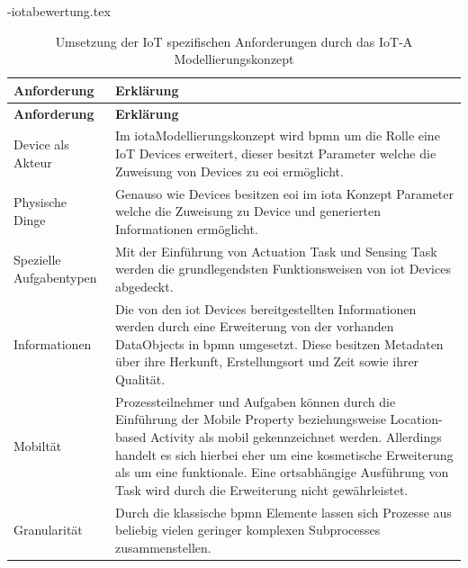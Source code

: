 \documentclass[a4paper, 12pt, twoside, headsepline=true]{scrartcl} %
\begin{document}
\begin{filecontents}{\jobname-iotabewertung.tex}
	\begin{longtable}{P{4cm}|X}
		\caption{Umsetzung der IoT spezifischen Anforderungen durch das IoT-A Modellierungskonzept}\\
		\label{table:evaluierungskriterien}
		\textbf{Anforderung} & \textbf{Erklärung}   \\ \hline
		\endfirsthead %
		\textbf{Anforderung} & \textbf{Erklärung}  \\ \hline
		\endhead
		Device als Akteur & Im \ac{iota}Modellierungskonzept wird \ac{bpmn} um die Rolle eine IoT Devices erweitert, dieser besitzt Parameter welche die Zuweisung von Devices zu \ac{eoi} ermöglicht.\\ \hline
		Physische Dinge  & Genauso wie Devices besitzen \ac{eoi} im \ac{iota} Konzept Parameter welche die Zuweisung zu Device und generierten Informationen ermöglicht.\\ \hline
		Spezielle Aufgabentypen & Mit der Einführung von Actuation Task und Sensing Task werden die grundlegendsten Funktionsweisen von \ac{iot} Devices abgedeckt.\\ \hline
		Informationen  & Die von den \ac{iot} Devices bereitgestellten Informationen werden durch eine Erweiterung von der vorhanden DataObjects in \ac{bpmn} umgesetzt. Diese besitzen Metadaten über ihre Herkunft, Erstellungsort und Zeit sowie ihrer Qualität.\\ \hline
		Mobiltät & Prozessteilnehmer und Aufgaben können durch die Einführung der Mobile Property beziehungsweise Location-based Activity als mobil gekennzeichnet werden. Allerdings handelt es sich hierbei eher um eine kosmetische Erweiterung als um eine funktionale. Eine ortsabhängige Ausführung von Task wird durch die Erweiterung nicht gewährleistet.\\ \hline
		Granularität & Durch die klassische \ac{bpmn} Elemente lassen sich Prozesse aus beliebig vielen geringer komplexen Subprocesses zusammenstellen.\\ 
	\end{longtable}
\end{filecontents}
\end{document}
